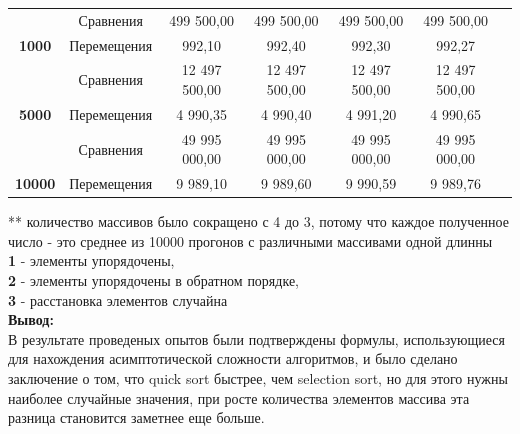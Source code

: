 \documentclass[a4paper,10pt]{article}
\begin{document}
\begin{table}[H]
\begin{tabular}{ccccccl}
        {\color[HTML]{3F3B42} }                                 & Сравнения                                   & 499 500,00           & 499 500,00           & 499 500,00           & 499 500,00                                  &  \\
        \multirow{-2}{*}{{\color[HTML]{3F3B42} \textbf{1000}}}  & Перемещения                                 & 992,10               & 992,40               & 992,30               & 992,27                                      &  \\
        {\color[HTML]{3F3B42} }                                 & Сравнения                                   & 12 497 500,00        & 12 497 500,00        & 12 497 500,00        & 12 497 500,00                               &  \\
        \multirow{-2}{*}{{\color[HTML]{3F3B42} \textbf{5000}}}  & Перемещения                                 & 4 990,35             & 4 990,40             & 4 991,20             & 4 990,65                                    &  \\
        {\color[HTML]{3F3B42} }                                 & Сравнения                                   & 49 995 000,00        & 49 995 000,00        & 49 995 000,00        & 49 995 000,00                               &  \\
        \multirow{-2}{*}{{\color[HTML]{3F3B42} \textbf{10000}}} & Перемещения                                 & 9 989,10             & 9 989,60             & 9 990,59             & 9 989,76                                    & 
        \end{tabular}
    \end{table}
    \vspace{0.3cm}
    ** количество массивов  было сокращено с 4 до 3, потому что каждое полученное число - это среднее из 10000 прогонов с различными массивами одной длинны\\

    \textbf{1} - элементы упорядочены, \\ 
    \textbf{2} - элементы упорядочены в обратном порядке,\\ 
    \textbf{3} - расстановка элементов случайна\\
    

    \vspace{0.8cm}
    \large{\textbf{Вывод:}}\\
    В результате проведеных опытов были подтверждены формулы, использующиеся для нахождения асимптотической сложности алгоритмов, и было сделано заключение о том, что quick sort быстрее, чем selection sort, но для этого нужны наиболее случайные значения, при росте количества элементов массива эта разница становится заметнее еще больше.
\end{document}
